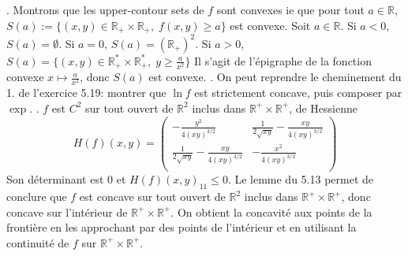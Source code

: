 \documentclass{report}
\begin{document}
\subsection{} \noindent{}\\ 
\\ 
\\
. Montrons que les upper-contour sets de $f$ sont convexes ie que pour tout $a\in \mathbb R$, $S(a):=\{(x,y)\in \mathbb R_+\times \mathbb R_+,\; f(x,y)\geq a\}$ est convexe. \newline
Soit $a\in \mathbb R$. Si $a<0$, $S(a)=\emptyset$. Si $a=0$, $S(a)=(\mathbb R_+)^2$.\newline
Si $a>0$, $S(a)=\{(x,y)\in \mathbb R^*_+ \times \mathbb R^*_+, \; y\geq \frac{a}{x^2} \}$
Il s'agit de l'épigraphe de la fonction convexe $x\mapsto \frac{a}{x^2}$, donc $S(a)$ est convexe. \newline
{}. On peut reprendre le cheminement du 1. de l'exercice 5.19: montrer que $\ln f$ est strictement concave, puis composer par $\exp$. \newline
{}. $f$ est $C^2$ sur tout ouvert de $\mathbb R^2$ inclus dans $\mathbb R^+\times \mathbb R^+$, de Hessienne 
$$H(f)(x,y) = \left(
\begin{array}{cc}
 -\frac{y^2}{4 (x y)^{3/2}} & \frac{1}{2 \sqrt{x y}}-\frac{x y}{4 (x y)^{3/2}} \\
 \frac{1}{2 \sqrt{x y}}-\frac{x y}{4 (x y)^{3/2}} & -\frac{x^2}{4 (x y)^{3/2}} \\
\end{array}
\right)$$
Son déterminant est $0$ et $H(f)(x,y)_{11} \leq 0$. Le lemme du 5.13 permet de conclure que $f$ est concave sur tout ouvert de $\mathbb R^2$ inclus dans $\mathbb R^+\times \mathbb R^+$, donc concave sur l'intérieur de $\mathbb R^+\times \mathbb R^+$.\newline
On obtient la concavité aux points de la frontière en les approchant par des points de l'intérieur et en utilisant la continuité de $f$ sur $\mathbb R^+\times \mathbb R^+$.
\end{document}
